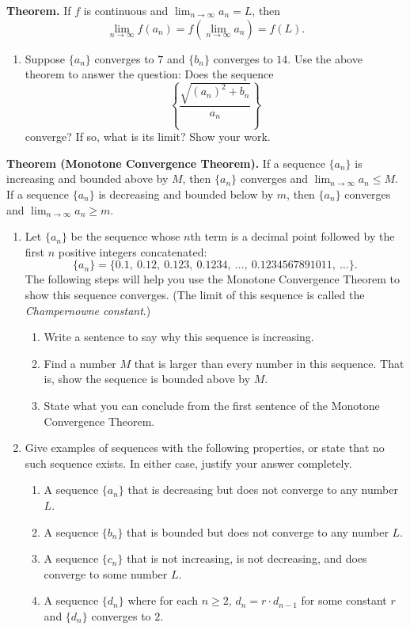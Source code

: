 \documentclass[12pt]{article}
\begin{document}
\vspace{0.5cm}

\noindent \textbf{Theorem.} If $f$ is continuous and $\displaystyle \lim_{n \to \infty} a_n = L$, then
\[
\lim_{n \to \infty} f(a_n) = f\!\left(\lim_{n \to \infty} a_n\right) = f(L).
\]

\begin{enumerate}[resume]
    \item Suppose $\{a_n\}$ converges to $7$ and $\{b_n\}$ converges to $14$. 
    Use the above theorem to answer the question: Does the sequence
    \[
    \left\{ \frac{\sqrt{(a_n)^2 + b_n}}{a_n} \right\}
    \]
    converge? If so, what is its limit? Show your work.
\end{enumerate}

\vspace{0.5cm}

\noindent \textbf{Theorem (Monotone Convergence Theorem).} 
If a sequence $\{a_n\}$ is increasing and bounded above by $M$, then $\{a_n\}$ converges and $\lim_{n \to \infty} a_n \le M$. 
If a sequence $\{a_n\}$ is decreasing and bounded below by $m$, then $\{a_n\}$ converges and $\lim_{n \to \infty} a_n \ge m$.

\begin{enumerate}[resume]
    \item Let $\{a_n\}$ be the sequence whose $n$th term is a decimal point followed by the first $n$ positive integers concatenated:
    \[
    \{a_n\} = \{0.1,\ 0.12,\ 0.123,\ 0.1234,\ \ldots,\ 0.1234567891011,\ \ldots\}.
    \]
    The following steps will help you use the Monotone Convergence Theorem to show this sequence converges. 
    (The limit of this sequence is called the \emph{Champernowne constant}.)
    \begin{enumerate}[label=(\alph*)]
        \item Write a sentence to say why this sequence is increasing.
        \item Find a number $M$ that is larger than every number in this sequence. That is, show the sequence is bounded above by $M$.
        \item State what you can conclude from the first sentence of the Monotone Convergence Theorem.
    \end{enumerate}

    \item Give examples of sequences with the following properties, or state that no such sequence exists. 
    In either case, justify your answer completely.
    \begin{enumerate}[label=(\alph*)]
        \item A sequence $\{a_n\}$ that is decreasing but does not converge to any number $L$.
        \item A sequence $\{b_n\}$ that is bounded but does not converge to any number $L$.
        \item A sequence $\{c_n\}$ that is not increasing, is not decreasing, and does converge to some number $L$.
        \item A sequence $\{d_n\}$ where for each $n \ge 2$, $d_n = r \cdot d_{n-1}$ for some constant $r$ and $\{d_n\}$ converges to $2$.
    \end{enumerate}
\end{enumerate}
\end{document}
